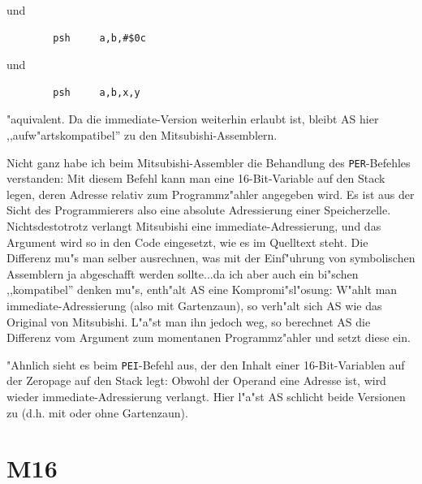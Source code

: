 \documentclass[12pt,a4paper,twoside]{report}
\newcommand{\tty}[1]{{\tt #1}}
\newcommand{\asname}{AS}
\begin{document}
und
\begin{verbatim}
        psh     a,b,#$0c
\end{verbatim}
und
\begin{verbatim}
        psh     a,b,x,y
\end{verbatim}
"aquivalent.  Da die immediate-Version weiterhin erlaubt ist, bleibt
\asname{} hier ,,aufw"artskompatibel'' zu den Mitsubishi-Assemblern.
\par
Nicht ganz habe ich beim Mitsubishi-Assembler die Behandlung des
\tty{PER}-Befehles verstanden: Mit diesem Befehl kann man eine
16-Bit-Variable auf den Stack legen, deren Adresse relativ zum
Programmz"ahler angegeben wird.  Es ist aus der Sicht des Programmierers
also eine absolute Adressierung einer Speicherzelle.  Nichtsdestotrotz
verlangt Mitsubishi eine immediate-Adressierung, und das Argument wird so
in den Code eingesetzt, wie es im Quelltext steht.  Die Differenz mu"s
man selber ausrechnen, was mit der Einf"uhrung von symbolischen Assemblern
ja abgeschafft werden sollte...da ich aber auch ein bi"schen ,,kompatibel''
denken mu"s, enth"alt \asname{} eine Kompromi"sl"osung: W"ahlt man
immediate-Adressierung (also mit Gartenzaun), so verh"alt sich \asname{} wie das
Original von Mitsubishi.  L"a"st man ihn jedoch weg, so berechnet \asname{} die
Differenz vom Argument zum momentanen Programmz"ahler und setzt diese
ein.
\par
"Ahnlich sieht es beim \tty{PEI}-Befehl aus, der den Inhalt einer
16-Bit-Variablen auf der Zeropage auf den Stack legt:  Obwohl der Operand
eine Adresse ist, wird wieder immediate-Adressierung verlangt.  Hier
l"a"st \asname{} schlicht beide Versionen zu (d.h. mit oder ohne Gartenzaun).


\section{M16}
\end{document}

